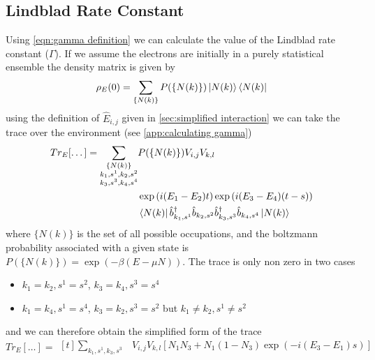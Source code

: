 \subsection{Lindblad Rate Constant}
Using \cref{eqn:gamma definition}
we can calculate the value of
the Lindblad rate constant (\(\Gamma \)).
If we assume the electrons
are initially in a purely
statistical ensemble the
density matrix is given
by\cite{sakurai_napolitano_2020}
\begin{equation}
    \rho_E(0) = \sum_{\{N(k)\}}
    P(\{N(k)\})
    \ket{N(k)} \bra{N(k)}
\end{equation}
using the definition
of \(\hat{E}_{i,j}\) given
in \cref{sec:simplified interaction}
we can
take the trace over the
environment (see \cref{app:calculating gamma})
\begin{equation}
    Tr_E[\dots]  = \begin{aligned}[t]
        \sum_{\substack{\{N(k)\}                             \\
        k_1,s^1,k_2,s^2                                      \\
                k_3,s^3,k_4,s^4 }}
         & P(\{N(k)\}) V_{i,j} V_{k,l}                       \\
         & \exp{(i(E_1 - E_2) t)} \exp{(i(E_3 - E_4) (t-s))} \\
         & \bra{N(k)}
        \hat{b}_{k_1,s^1}^\dagger{} \hat{b}_{k_2,s^2}
        \hat{b}_{k_3,s^3}^\dagger{} \hat{b}_{k_4,s^4}
        \ket{N(k)}
    \end{aligned}
\end{equation}
where \( \{N(k)\} \) is the set of
all possible occupations, and
the boltzmann
probability associated with a
given state is
\(P(\{N(k)\}) = \exp{(-\beta{}(E-\mu N))}\).
The trace is only non zero in two
cases
\begin{itemize}
    \item \(k_1=k_2, s^1=s^2\),
          \(k_3=k_4, s^3=s^4\)
    \item \(k_1=k_4, s^1=s^4\),
          \(k_3=k_2, s^3=s^2\) but
          \(k_1\neq{}k_2, s^1\neq{}s^2\)
\end{itemize}
and we can therefore obtain the
simplified form of the trace
\begin{equation}
    Tr_E[\dots] = \begin{aligned}[t]
        \sum_{k_1,s^1,k_3,s^3 }
         & V_{i,j} V_{k,l} [
                N_1 N_3
                + N_1 (1 - N_3) \exp{(-i(E_3 - E_1)s)}]
    \end{aligned}
\end{equation}
